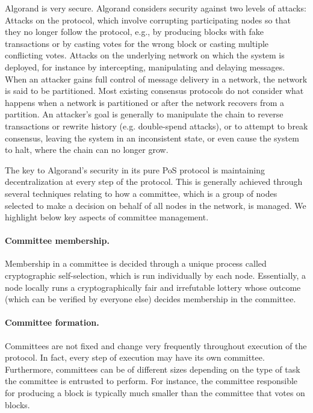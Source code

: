 Algorand is very secure. Algorand considers security against two levels of attacks: 
Attacks on the protocol, which involve corrupting participating nodes so that they no longer follow the protocol, e.g., by producing blocks with fake transactions or by casting votes for the wrong block or casting multiple conflicting votes. 
Attacks on the underlying network on which the system is deployed, for instance by intercepting, manipulating and delaying messages. When an attacker gains full control of message delivery in a network, the network is said to be partitioned. Most existing consensus protocols do not consider what happens when a network is partitioned or after the network recovers from a partition.
An attacker's goal is generally to manipulate the chain to reverse transactions or rewrite history (e.g. double-spend attacks), or to attempt to break consensus, leaving the system in an inconsistent state, or even cause the system to halt, where the chain can no longer grow.

The key to Algorand's security in its pure PoS protocol is maintaining decentralization at every step of the protocol. This is generally achieved through several techniques relating to how a committee, which is a group of nodes selected to make a decision on behalf of all nodes in the network, is managed. We highlight below key aspects of committee management.

\paragraph{Committee membership.} Membership in a committee is decided through a unique process called cryptographic self-selection, which is run individually by each node. Essentially, a node locally runs a cryptographically fair and irrefutable lottery whose outcome (which can be verified by everyone else) decides membership in the committee.

\paragraph{Committee formation.} Committees are not fixed and change very frequently throughout execution of the protocol. In fact, every step of execution may have its own committee. Furthermore, committees can be of different sizes depending on the type of task the committee is entrusted to perform. For instance, the committee responsible for producing a block is typically much smaller than the committee that votes on blocks.

